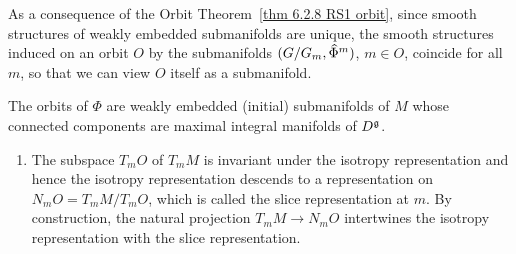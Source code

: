 As a consequence of the Orbit Theorem~\ref{thm 6.2.8 RS1 orbit}, since smooth structures of weakly embedded submanifolds are unique, the smooth structures induced on an orbit $O$ by the submanifolds $(G\slash G_m,\wh{\Phi}^m)$, $m\in O$, coincide for all $m$, so that we can view $O$ itself as a submanifold.  

\begin{cor}[{{\cite[Cor.~6.2.9]{RS1}}}]
    The orbits of $\Phi$ are weakly embedded (initial) submanifolds of $M$ whose connected components are maximal integral manifolds of $D^{\mathfrak{g}}$.
\end{cor}

\begin{rem}[{{\cite[Rem.~6.2.10]{RS1}}}]\label{rem 6.2.10 RS1}
    \begin{enumerate}
        \item The subspace $T_mO$ of $T_mM$ is invariant under the isotropy representation and hence the isotropy representation descends to a representation on $N_mO=T_mM\slash T_mO$, which is called the slice representation at $m$. By construction, the natural projection $T_mM\to N_mO$ intertwines the isotropy representation with the slice representation.


\end{enumerate}
\end{rem}
